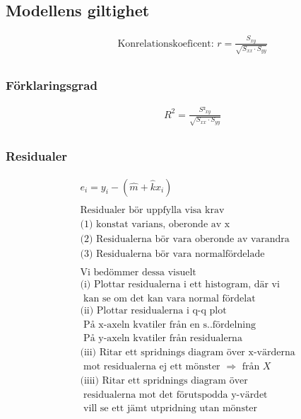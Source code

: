 \begin{multicols}{2}
\subsection{Modellens giltighet}
\begin{align*}
  &\quad  \text{Konrelationskoeficent: } r=\frac{S_{xy}}{\sqrt{S_{xx}\cdot S_{yy}}} \\
\end{align*}

\subsubsection{Förklaringsgrad}
\begin{align*}
  &\quad  R^2=\frac{S²_{xy}}{\sqrt{S_{xx}\cdot S_{yy}}} \\
\end{align*}

\subsubsection{Residualer}
\begin{align*}
  &e_i=y_i-(\hat{m}+\hat{k}x_i) \\
  &\\
  &\text{Residualer bör uppfylla visa krav}\\
  &\text{(1) konstat varians, oberonde av x} \\
  &\text{(2) Residualerna bör vara oberonde av varandra} \\
  &\text{(3) Residualerna bör vara normalfördelade} \\
  &\\
  &\text{Vi bedömmer dessa visuelt} \\
  &\text{(i) Plottar residualerna i ett histogram, där vi} \\
  &\text{  kan se om det kan vara normal fördelat} \\
  &\text{(ii) Plottar residualerna i q-q plot} \\
  &\text{  På x-axeln kvatiler från en s..fördelning} \\
  &\text{  På y-axeln kvatiler från residualerna} \\
  &\text{(iii) Ritar ett spridnings diagram över x-värderna} \\
  &\text{ mot residualerna ej ett mönster $\Rightarrow$ från $X$} \\
  &\text{(iiii) Ritar ett spridnings diagram över} \\
  &\text{ residualerna mot det förutspodda y-värdet} \\
  &\text{ vill se ett jämt utpridning utan mönster} \\
\end{align*}


\end{multicols}
